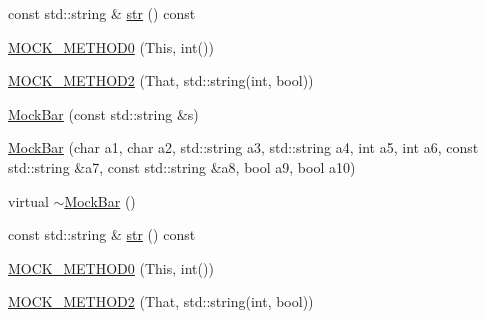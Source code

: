 \begin{DoxyCompactItemize}
\item 
const std\+::string \& \mbox{\hyperlink{classtesting_1_1gmock__nice__strict__test_1_1_mock_bar_adc0fb56c042e95e1a459bb007e813169}{str}} () const
\item 
\mbox{\hyperlink{classtesting_1_1gmock__nice__strict__test_1_1_mock_bar_a9aad688c2b1dc6b529b7c499e49e3a70}{M\+O\+C\+K\+\_\+\+M\+E\+T\+H\+O\+D0}} (This, int())
\item 
\mbox{\hyperlink{classtesting_1_1gmock__nice__strict__test_1_1_mock_bar_afa41d45dd7066f014f755f152ec16a73}{M\+O\+C\+K\+\_\+\+M\+E\+T\+H\+O\+D2}} (That, std\+::string(int, bool))
\item 
\mbox{\hyperlink{classtesting_1_1gmock__nice__strict__test_1_1_mock_bar_abd4e7936dc389201ce608257f7a02584}{Mock\+Bar}} (const std\+::string \&s)
\item 
\mbox{\hyperlink{classtesting_1_1gmock__nice__strict__test_1_1_mock_bar_ad6b73066fdcdd71ac1add73ef56b53ef}{Mock\+Bar}} (char a1, char a2, std\+::string a3, std\+::string a4, int a5, int a6, const std\+::string \&a7, const std\+::string \&a8, bool a9, bool a10)
\item 
virtual \mbox{\hyperlink{classtesting_1_1gmock__nice__strict__test_1_1_mock_bar_a0559a3ecd9ecb4eebd5f519bf96bf03b}{$\sim$\+Mock\+Bar}} ()
\item 
const std\+::string \& \mbox{\hyperlink{classtesting_1_1gmock__nice__strict__test_1_1_mock_bar_adc0fb56c042e95e1a459bb007e813169}{str}} () const
\item 
\mbox{\hyperlink{classtesting_1_1gmock__nice__strict__test_1_1_mock_bar_a9aad688c2b1dc6b529b7c499e49e3a70}{M\+O\+C\+K\+\_\+\+M\+E\+T\+H\+O\+D0}} (This, int())
\item 
\mbox{\hyperlink{classtesting_1_1gmock__nice__strict__test_1_1_mock_bar_afa41d45dd7066f014f755f152ec16a73}{M\+O\+C\+K\+\_\+\+M\+E\+T\+H\+O\+D2}} (That, std\+::string(int, bool))
\end{DoxyCompactItemize}
